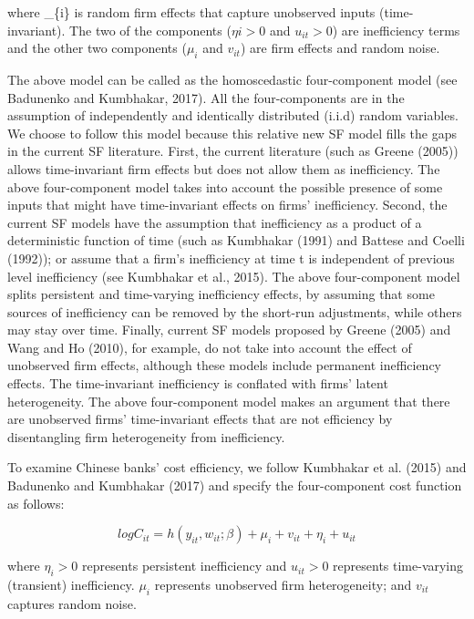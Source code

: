 \documentclass[
  12pt,
  a4paper,
]{scrreprt}
\begin{document}
where \mu\_\{i\} is random firm effects that capture unobserved inputs
(time-invariant). The two of the components (\(\eta{i}>0\) and
\(u_{it}>0\)) are inefficiency terms and the other two components
(\(\mu_{i}\) and \(v_{it}\)) are firm effects and random noise.

The above model can be called as the homoscedastic four-component model
(see Badunenko and Kumbhakar, 2017). All the four-components are in the
assumption of independently and identically distributed (i.i.d) random
variables. We choose to follow this model because this relative new SF
model fills the gaps in the current SF literature. First, the current
literature (such as Greene (2005)) allows time-invariant firm effects
but does not allow them as inefficiency. The above four-component model
takes into account the possible presence of some inputs that might have
time-invariant effects on firms' inefficiency. Second, the current SF
models have the assumption that inefficiency as a product of a
deterministic function of time (such as Kumbhakar (1991) and Battese and
Coelli (1992)); or assume that a firm's inefficiency at time t is
independent of previous level inefficiency (see Kumbhakar et al., 2015).
The above four-component model splits persistent and time-varying
inefficiency effects, by assuming that some sources of inefficiency can
be removed by the short-run adjustments, while others may stay over
time. Finally, current SF models proposed by Greene (2005) and Wang and
Ho (2010), for example, do not take into account the effect of
unobserved firm effects, although these models include permanent
inefficiency effects. The time-invariant inefficiency is conflated with
firms' latent heterogeneity. The above four-component model makes an
argument that there are unobserved firms' time-invariant effects that
are not efficiency by disentangling firm heterogeneity from
inefficiency.

To examine Chinese banks' cost efficiency, we follow Kumbhakar et al.
(2015) and Badunenko and Kumbhakar (2017) and specify the four-component
cost function as follows:

\begin{equation}
logC_{it} = h(y_{it}, w_{it}; \beta) + \mu_{i} + v_{it} + \eta_{i} + u_{it}
\end{equation}

where \(\eta_{i}>0\) represents persistent inefficiency and \(u_{it}>0\)
represents time-varying (transient) inefficiency. \(\mu_{i}\) represents
unobserved firm heterogeneity; and \(v_{it}\) captures random noise.
\end{document}
